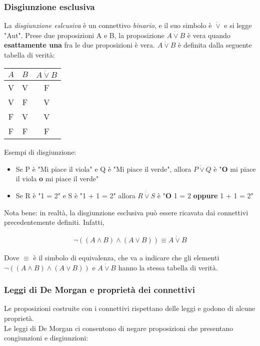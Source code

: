 \documentclass{article}
\begin{document}
\subsubsection{Disgiunzione esclusiva}
La \textit{disgiunzione eslcusiva} è un connettivo \textit{binario}, e il suo simbolo è $\dot{\lor}$ e si legge
"Aut". 
Prese due proposizioni A e B, la proposizione $A \dot{\lor} B$ è vera quando \textbf{esattamente una}
fra le due proposizioni è vera. $A \dot{\lor} B$ è definita dalla seguente tabella di verità:
\vspace{0.3cm}
\begin{center}
  \begin{tabular}{|c|c|c|}
    \hline
    $A$ & $B$ & $A \dot{\lor} B$ \\
    \hline
    V & V & F \\
    \hline
    V & F & V \\
    \hline
    F & V & V \\
    \hline
    F & F & F \\
    \hline
  \end{tabular}
\end{center}
\vspace{0.2cm}
Esempi di disgiunzione: 
\begin{itemize}[itemsep=0.05mm]
  \item Se P è "Mi piace il viola" e Q è "Mi piace il verde", allora $P \dot{\lor} Q$ è "\textbf{O} mi piace il viola \textbf{o} mi piace il verde"
  \item Se R è "1 = 2" e S è "1 + 1 = 2" allora  $R \dot{\lor} S$ è "\textbf{O} 1 = 2 \textbf{oppure} 1 + 1 = 2"
\end{itemize}

Nota bene: in realtà, la disgiunzione esclusiva può essere ricavata dai connettivi precedentemente
definiti. Infatti,
\vspace{-1.5em}
\begin{center}
  \begin{align}
    \neg((A \land B) \land (A \lor B)) \equiv A \dot{\lor} B \label{2}
  \end{align}
\end{center}
Dove $\equiv$ è il simbolo di equivalenza, che va a indicare che gli elementi 
$\neg((A \land B) \land (A \lor B))$ e $A \dot{\lor} B$ hanno la stessa tabella 
di verità.

\subsubsection{Leggi di De Morgan e proprietà dei connettivi}
Le proposizioni costruite con i connettivi rispettano delle leggi e godono di alcune proprietà. \\
Le leggi di De Morgan ci consentono di negare proposizioni che presentano congiunzioni
e disgiunzioni:
\end{document}

